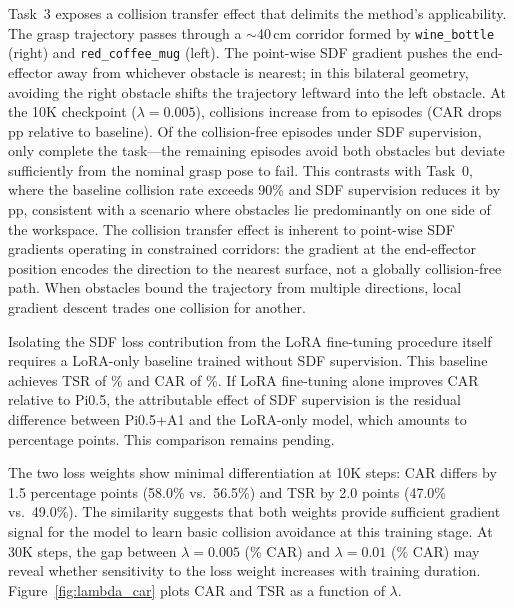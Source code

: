 Task~3 exposes a collision transfer effect that delimits the method's applicability. The grasp trajectory passes through a ${\sim}$40\,cm corridor formed by \texttt{wine\_bottle} (right) and \texttt{red\_coffee\_mug} (left). The point-wise SDF gradient pushes the end-effector away from whichever obstacle is nearest; in this bilateral geometry, avoiding the right obstacle shifts the trajectory leftward into the left obstacle. At the 10K checkpoint ($\lambda = 0.005$), collisions increase from  to  episodes (CAR drops \,pp relative to baseline). Of the  collision-free episodes under SDF supervision, only  complete the task---the remaining episodes avoid both obstacles but deviate sufficiently from the nominal grasp pose to fail. This contrasts with Task~0, where the baseline collision rate exceeds 90\% and SDF supervision reduces it by \,pp, consistent with a scenario where obstacles lie predominantly on one side of the workspace. The collision transfer effect is inherent to point-wise SDF gradients operating in constrained corridors: the gradient at the end-effector position encodes the direction to the nearest surface, not a globally collision-free path. When obstacles bound the trajectory from multiple directions, local gradient descent trades one collision for another.

Isolating the SDF loss contribution from the LoRA fine-tuning procedure itself requires a LoRA-only baseline trained without SDF supervision. This baseline achieves TSR of \% and CAR of \%. If LoRA fine-tuning alone improves CAR relative to Pi0.5, the attributable effect of SDF supervision is the residual difference between Pi0.5+A1 and the LoRA-only model, which amounts to  percentage points. This comparison remains pending.

The two loss weights show minimal differentiation at 10K steps: CAR differs by 1.5 percentage points (58.0\% vs.\ 56.5\%) and TSR by 2.0 points (47.0\% vs.\ 49.0\%). The similarity suggests that both weights provide sufficient gradient signal for the model to learn basic collision avoidance at this training stage. At 30K steps, the gap between $\lambda = 0.005$ (\% CAR) and $\lambda = 0.01$ (\% CAR) may reveal whether sensitivity to the loss weight increases with training duration. Figure~\ref{fig:lambda_car} plots CAR and TSR as a function of $\lambda$.

